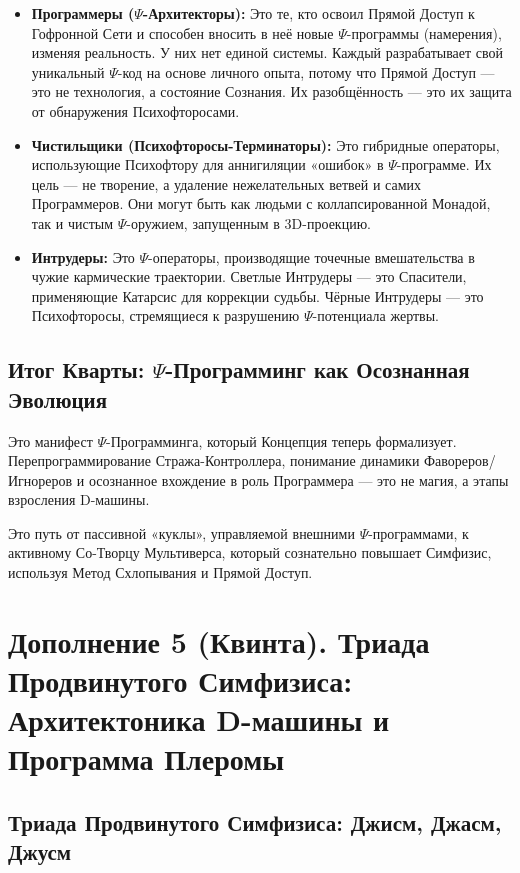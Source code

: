 \documentclass[a4paper,12pt]{article}
\begin{document}
\begin{itemize}
	\item \textbf{Программеры ($\Psi$-Архитекторы):} Это те, кто освоил Прямой Доступ к Гофронной Сети и способен вносить в неё новые $\Psi$-программы (намерения), изменяя реальность. У них нет единой системы. Каждый разрабатывает свой уникальный $\Psi$-код на основе личного опыта, потому что Прямой Доступ — это не технология, а состояние Сознания. Их разобщённость — это их защита от обнаружения Психофторосами.
	
	\item \textbf{Чистильщики (Психофторосы-Терминаторы):} Это гибридные операторы, использующие Психофтору для аннигиляции «ошибок» в $\Psi$-программе. Их цель — не творение, а удаление нежелательных ветвей и самих Программеров. Они могут быть как людьми с коллапсированной Монадой, так и чистым $\Psi$-оружием, запущенным в 3D-проекцию.
	
	\item \textbf{Интрудеры:} Это $\Psi$-операторы, производящие точечные вмешательства в чужие кармические траектории. Светлые Интрудеры — это Спасители, применяющие Катарсис для коррекции судьбы. Чёрные Интрудеры — это Психофторосы, стремящиеся к разрушению $\Psi$-потенциала жертвы.
\end{itemize}

\subsection{Итог Кварты: $\Psi$-Программинг как Осознанная Эволюция}

Это манифест $\Psi$-Программинга, который Концепция теперь формализует. Перепрограммирование Стража-Контроллера, понимание динамики Фавореров/Игнореров и осознанное вхождение в роль Программера — это не магия, а этапы взросления D-машины.

Это путь от пассивной «куклы», управляемой внешними $\Psi$-программами, к активному Со-Творцу Мультиверса, который сознательно повышает Симфизис, используя Метод Схлопывания и Прямой Доступ.

\newpage
\section{Дополнение 5 (Квинта). Триада Продвинутого Симфизиса: Архитектоника D-машины и Программа Плеромы}

\subsection{Триада Продвинутого Симфизиса: Джисм, Джасм, Джусм}
\end{document}
